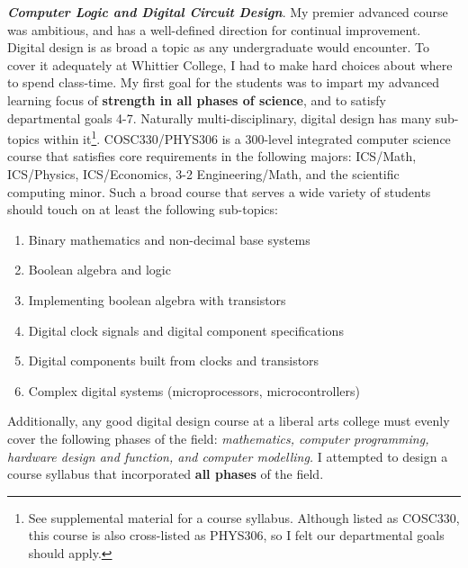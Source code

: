 \documentclass[../../../main.tex]{subfiles}
\begin{document}
\textbf{\textit{Computer Logic and Digital Circuit Design}}. My premier advanced course was ambitious, and has a well-defined direction for continual improvement.  Digital design is as broad a topic as any undergraduate would encounter.  To cover it adequately at Whittier College, I had to make hard choices about where to spend class-time. My first goal for the students was to impart my advanced learning focus of \textbf{strength in all phases of science}, and to satisfy departmental goals 4-7. Naturally multi-disciplinary, digital design has many sub-topics within it\footnote{See supplemental material for a course syllabus.  Although listed as COSC330, this course is also cross-listed as PHYS306, so I felt our departmental goals should apply.}.  COSC330/PHYS306 is a 300-level integrated computer science course that satisfies core requirements in the following majors: ICS/Math, ICS/Physics, ICS/Economics, 3-2 Engineering/Math, and the scientific computing minor.  Such a broad course that serves a wide variety of students should touch on at least the following sub-topics:

\begin{enumerate}
\item Binary mathematics and non-decimal base systems
\item Boolean algebra and logic
\item Implementing boolean algebra with transistors
\item Digital clock signals and digital component specifications
\item Digital components built from clocks and transistors
\item Complex digital systems (microprocessors, microcontrollers)
\end{enumerate}

Additionally, any good digital design course at a liberal arts college must evenly cover the following phases of the field: \textit{mathematics, computer programming, hardware design and function, and computer modelling.}  I attempted to design a course syllabus that incorporated \textbf{all phases} of the field.
\end{document}

